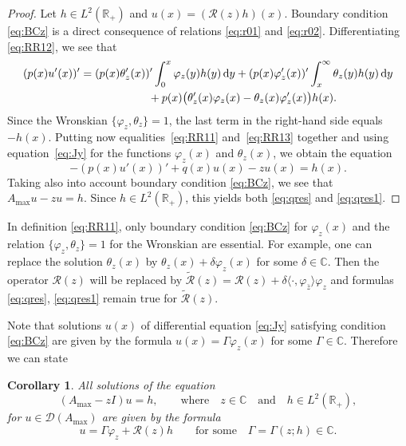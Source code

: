 \documentclass[10pt,a4paper]{amsart}
\numberwithin{equation}{section}
\newtheorem{Corollary}[Theorem]{Corollary}
\begin{document}
 \begin{proof}
 Let $h\in L^2 ({\mathbb R}_{+})$ and $u(x)= ({\mathcal R} (z)h)(x)$. Boundary condition \eqref{eq:BCz} is a direct consequence of relations \eqref{eq:r01} and \eqref{eq:r02}. Differentiating \eqref{eq:RR12}, we see that
 \begin{gather}
 (p(x)u' (x))' = (p(x) \theta_{z}' (x) )'\int_{0}^x \varphi_{z} (y) h(y) \,{\rm d}y+ (p(x) \varphi_{z}' (x) )' \int_x^\infty \theta_{z} (y) h(y) \,{\rm d}y \nonumber \\
 \hphantom{(p(x)u' (x))' =}{} + p(x) \big( \theta'_{z}(x) \varphi_{z}(x)-\theta
 _{z}(x) \varphi'_{z}(x)\big) h(x).
 \label{eq:RR13}\end{gather}
Since the Wronskian $\{ \varphi_{z}, \theta_{z}\}=1 $, the last term in the right-hand side equals $-h(x)$. Putting now equalities~\eqref{eq:RR11} and~\eqref{eq:RR13} together and using equation~\eqref{eq:Jy} for the functions $\varphi_{z}(x)$ and $\theta_{z}(x)$, we obtain the equation
\[
- (p(x) u' (x))' + q(x) u(x)-z u(x)=h(x) .
 \]
 Taking also into account boundary condition \eqref{eq:BCz}, we see that $ A_{\max} u -z u=h $. Since $h\in L^2 ({\mathbb R}_{+})$, this yields both \eqref{eq:qres} and \eqref{eq:qres1}.
 \end{proof}

 \begin{Remark}\label{res3}
 In definition \eqref{eq:RR11}, only boundary condition \eqref{eq:BCz} for $\varphi_{z} (x)$ and the relation $\{ \varphi_{z}, \theta_{z}\}=1 $ for the Wronskian are essential. For example, one can replace the solution $\theta_{z}(x)$ by $\theta_{z}(x)+ \delta \varphi_{z} (x)$ for some $\delta \in {\mathbb C}$. Then the operator
 $ {\mathcal R} (z)$ will be replaced by
 $\widetilde{\mathcal R} (z)= {\mathcal R} (z) +\delta \langle \cdot, \varphi_{\bar{z} }\rangle \varphi_{z}$ and formulas \eqref{eq:qres}, \eqref{eq:qres1} remain true for $\widetilde{\mathcal R} (z)$.
 \end{Remark}

 Note that solutions $u(x)$ of differential equation \eqref{eq:Jy} satisfying condition \eqref{eq:BCz} are given by the formula $u(x)= \Gamma \varphi_{z} (x)$ for some $ \Gamma \in{\mathbb C}$. Therefore we
 can state

 \begin{Corollary}\label{res1}
 All solutions of the equation
 \[
(A_{\max} -zI) u =h, \qquad \mbox{where} \quad z\in {\mathbb C} \quad \mbox{and}\quad h\in L^2 ({\mathbb R}_{+}),
\]
 for $u\in {\mathcal D} (A_{\max} )$ are given by the formula
 \begin{equation}
 u = \Gamma \varphi_{z}+ {\mathcal R} (z) h \qquad \mbox{for some} \quad \Gamma=\Gamma (z;h) \in{\mathbb C}.
\label{eq:qres3}\end{equation}
 \end{Corollary}
\end{document}
